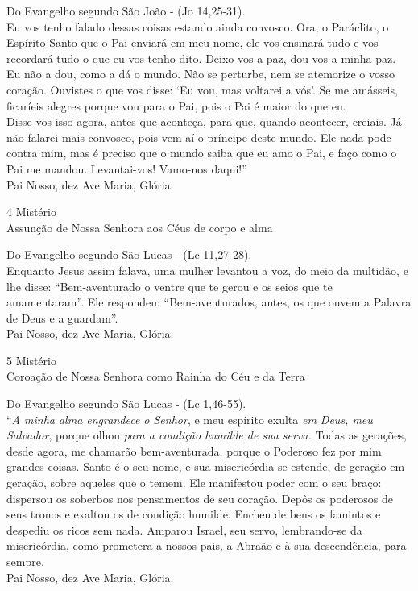 \begin{flushleft}
    Do Evangelho segundo São João - (\textcolor{VioletRed3}{Jo 14,25-31}). \\
    \hfill{} \break{}
    Eu vos tenho falado dessas coisas estando ainda convosco. Ora, o Paráclito, o Espírito Santo que o Pai enviará em meu nome, ele vos ensinará tudo e vos recordará tudo o que eu vos tenho dito. Deixo-vos a paz, dou-vos a minha paz. Eu não a dou, como a dá o mundo. Não se perturbe, nem se atemorize o vosso coração. Ouvistes o que vos disse: `Eu vou, mas voltarei a vós'. Se me amásseis, ficaríeis alegres porque vou para o Pai, pois o Pai é maior do que eu.
    \vspace{.2cm} \\
    Disse-vos isso agora, antes que aconteça, para que, quando acontecer, creiais. Já não falarei mais convosco, pois vem aí o príncipe deste mundo. Ele nada pode contra mim, mas é preciso que o mundo saiba que eu amo o Pai, e faço como o Pai me mandou. Levantai-vos! Vamo-nos daqui!'' \\
    \hfill{} \break{}
    Pai Nosso, dez Ave Maria, Glória.
\end{flushleft}
\begin{center}
    4\textordmasculine{} Mistério \\ Assunção de Nossa Senhora aos Céus de corpo e alma
\end{center}
\begin{flushleft}
    Do Evangelho segundo São Lucas - (\textcolor{VioletRed3}{Lc 11,27-28}). \\
    \hfill{} \break{}
    Enquanto Jesus assim falava, uma mulher levantou a voz, do meio da multidão, e lhe disse: ``Bem-aventurado o ventre que te gerou e os seios que te amamentaram''. Ele respondeu: ``Bem-aventurados, antes, os que ouvem a Palavra de Deus e a guardam''. \\
    \hfill{} \break{}
    Pai Nosso, dez Ave Maria, Glória.
\end{flushleft}
\newpage
\begin{center}
    5\textordmasculine{} Mistério \\ Coroação de Nossa Senhora como Rainha do Céu e da Terra
\end{center}
\begin{flushleft}
    Do Evangelho segundo São Lucas - (\textcolor{VioletRed3}{Lc 1,46-55}). \\
    \hfill{} \break{}
    ``\textit{A minha alma engrandece o Senhor}, e meu espírito exulta \textit{em Deus, meu Salvador}, porque olhou \textit{para a condição humilde de sua serva.} Todas as gerações, desde agora, me chamarão bem-aventurada, porque o Poderoso fez por mim grandes coisas. Santo é o seu nome, e sua misericórdia se estende, de geração em geração, sobre aqueles que o temem. Ele manifestou poder com o seu braço: dispersou os soberbos nos pensamentos de seu coração. Depôs os poderosos de seus tronos e exaltou os de condição humilde. Encheu de bens os famintos e despediu os ricos sem nada. Amparou Israel, seu servo, lembrando-se da misericórdia, como prometera a nossos pais, a Abraão e à sua descendência, para sempre. \\
    \hfill{} \break{}
    Pai Nosso, dez Ave Maria, Glória.
\end{flushleft}
